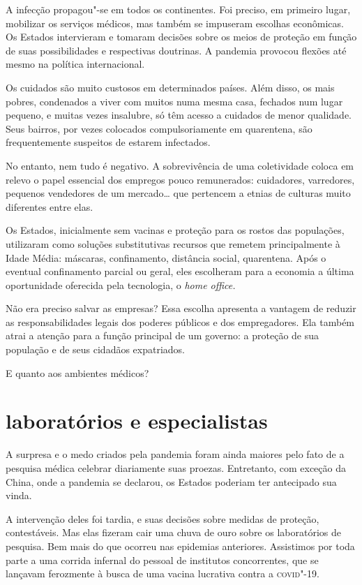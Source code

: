 A infecção propagou"-se em todos os continentes. Foi preciso, em primeiro
lugar, mobilizar os serviços médicos, mas também se impuseram escolhas
econômicas. Os Estados intervieram e tomaram decisões sobre os meios de
proteção em função de suas possibilidades e respectivas doutrinas. A
pandemia provocou flexões até mesmo na política internacional.

Os cuidados são muito custosos em determinados países. Além disso, os
mais pobres, condenados a viver com muitos numa mesma casa, fechados num
lugar pequeno, e muitas vezes insalubre, só têm acesso a cuidados de
menor qualidade. Seus bairros, por vezes colocados compulsoriamente em
quarentena, são frequentemente suspeitos de estarem infectados.

No entanto, nem tudo é negativo. A sobrevivência de uma coletividade
coloca em relevo o papel essencial dos empregos pouco remunerados:
cuidadores, varredores, pequenos vendedores de um mercado\ldots{} que
pertencem a etnias de culturas muito diferentes entre elas.

Os Estados, inicialmente sem vacinas e proteção para os rostos das
populações, utilizaram como soluções substitutivas recursos que remetem
principalmente à Idade Média: máscaras, confinamento, distância social,
quarentena. Após o eventual confinamento parcial ou geral, eles
escolheram para a economia a última oportunidade oferecida pela
tecnologia, o \emph{home office.}

Não era preciso salvar as empresas? Essa escolha apresenta a vantagem de
reduzir as responsabilidades legais dos poderes públicos e dos
empregadores. Ela também atrai a atenção para a função principal de um
governo: a proteção de sua população e de seus cidadãos expatriados.

E quanto aos ambientes médicos?

\section{laboratórios e especialistas}

A surpresa e o medo criados pela pandemia foram ainda maiores pelo fato
de a pesquisa médica celebrar diariamente suas proezas. Entretanto, com
exceção da China, onde a pandemia se declarou, os Estados poderiam ter
antecipado sua vinda.

A intervenção deles foi tardia, e suas decisões sobre medidas de
proteção, contestáveis. Mas elas fizeram cair uma chuva de ouro sobre os
laboratórios de pesquisa. Bem mais do que ocorreu nas epidemias
anteriores. Assistimos por toda parte a uma corrida infernal do pessoal
de institutos concorrentes, que se lançavam ferozmente à busca de uma
vacina lucrativa contra a \textsc{covid}"-19.

